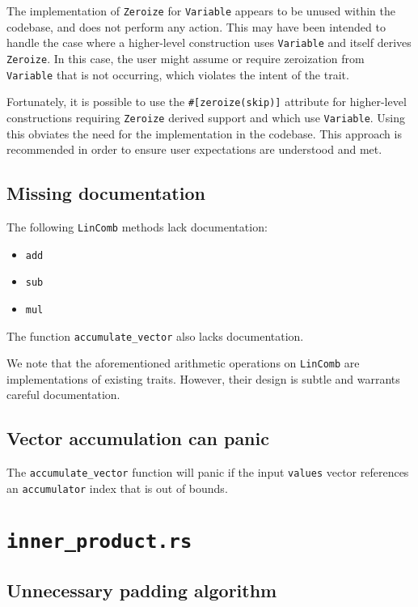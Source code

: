 \documentclass{article}
\begin{document}
The implementation of \texttt{Zeroize} for \texttt{Variable} appears to be unused within the codebase, and does not perform any action.
This may have been intended to handle the case where a higher-level construction uses \texttt{Variable} and itself derives \texttt{Zeroize}.
In this case, the user might assume or require zeroization from \texttt{Variable} that is not occurring, which violates the intent of the trait.

Fortunately, it is possible to use the \texttt{\#[zeroize(skip)]} attribute for higher-level constructions requiring \texttt{Zeroize} derived support and which use \texttt{Variable}.
Using this obviates the need for the implementation in the codebase.
This approach is recommended in order to ensure user expectations are understood and met.

\subsection{Missing documentation}

The following \texttt{LinComb} methods lack documentation:
\begin{itemize}
    \item \texttt{add}
    \item \texttt{sub}
    \item \texttt{mul}
\end{itemize}

The function \texttt{accumulate\_vector} also lacks documentation.

We note that the aforementioned arithmetic operations on \texttt{LinComb} are implementations of existing traits.
However, their design is subtle and warrants careful documentation.


\subsection{Vector accumulation can panic}

The \texttt{accumulate\_vector} function will panic if the input \texttt{values} vector references an \texttt{accumulator} index that is out of bounds.


\section{\texttt{inner\_product.rs}}

\subsection{Unnecessary padding algorithm}
\end{document}
